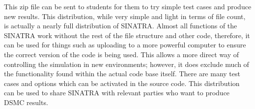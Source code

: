\indent This zip file can be sent to students for them to try simple test cases and produce new results. This distribution, while very simple and light in terms of file count, is actually a nearly full distribution of SINATRA. Almost all functions of the SINATRA work without the rest of the file structure and other code, therefore, it can be used for things such as uploading to a more powerful computer to ensure the correct version of the code is being used. This allows a more direct way of controlling the simulation in new environments; however, it does exclude much of the functionality found within the actual code base itself. There are many test cases and options which can be activated in the source code. This distribution can be used to share SINATRA with relevant parties who want to produce DSMC results.
